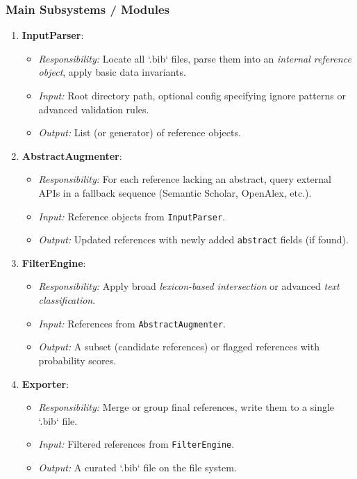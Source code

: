 \documentclass[12pt]{article}
\begin{document}
\subsubsection{Main Subsystems / Modules}
\begin{enumerate}[label=\alph*)]
  \item \textbf{InputParser}:
  \begin{itemize}
    \item \emph{Responsibility:} Locate all `.bib` files, parse them into an \emph{internal reference object}, apply basic data invariants.
    \item \emph{Input:} Root directory path, optional config specifying ignore patterns or advanced validation rules.
    \item \emph{Output:} List (or generator) of reference objects.
  \end{itemize}

  \item \textbf{AbstractAugmenter}:
  \begin{itemize}
    \item \emph{Responsibility:} For each reference lacking an abstract, query external APIs in a fallback sequence (Semantic Scholar, OpenAlex, etc.). 
    \item \emph{Input:} Reference objects from \texttt{InputParser}.
    \item \emph{Output:} Updated references with newly added \texttt{abstract} fields (if found). 
  \end{itemize}

  \item \textbf{FilterEngine}:
  \begin{itemize}
    \item \emph{Responsibility:} Apply broad \emph{lexicon-based intersection} or advanced \emph{text classification}. 
    \item \emph{Input:} References from \texttt{AbstractAugmenter}.
    \item \emph{Output:} A subset (candidate references) or flagged references with probability scores. 
  \end{itemize}

  \item \textbf{Exporter}:
  \begin{itemize}
    \item \emph{Responsibility:} Merge or group final references, write them to a single `.bib` file. 
    \item \emph{Input:} Filtered references from \texttt{FilterEngine}.
    \item \emph{Output:} A curated `.bib` file on the file system. 
  \end{itemize}


\end{enumerate}
\end{document}
